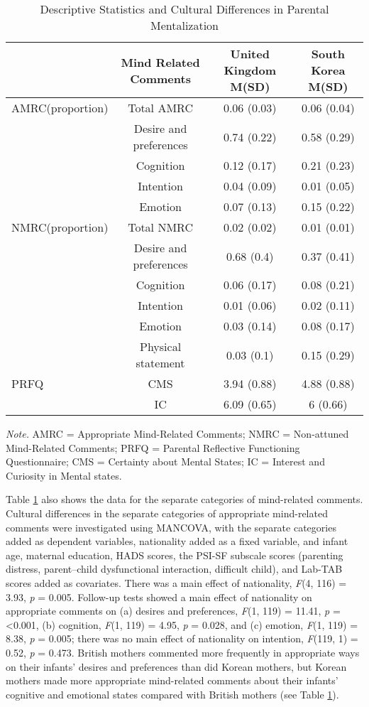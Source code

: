 \documentclass[
]{article}
\begin{document}
\begin{table}[H]

\caption{\label{tab:table2}Descriptive Statistics and Cultural Differences in Parental Mentalization}
\centering
\begin{tabular}[t]{lccc}
\toprule
\textbf{ } & \textbf{Mind Related Comments} & \textbf{United Kingdom M(SD)} & \textbf{South Korea M(SD)}\\
\midrule
AMRC(proportion) & Total AMRC & 0.06 (0.03) & 0.06 (0.04)\\
 & Desire and preferences & 0.74 (0.22) & 0.58 (0.29)\\
 & Cognition & 0.12 (0.17) & 0.21 (0.23)\\
 & Intention & 0.04 (0.09) & 0.01 (0.05)\\
 & Emotion & 0.07 (0.13) & 0.15 (0.22)\\
\addlinespace
NMRC(proportion) & Total NMRC & 0.02 (0.02) & 0.01 (0.01)\\
 & Desire and preferences & 0.68 (0.4) & 0.37 (0.41)\\
 & Cognition & 0.06 (0.17) & 0.08 (0.21)\\
 & Intention & 0.01 (0.06) & 0.02 (0.11)\\
 & Emotion & 0.03 (0.14) & 0.08 (0.17)\\
\addlinespace
 & Physical statement & 0.03 (0.1) & 0.15 (0.29)\\
PRFQ & CMS & 3.94 (0.88) & 4.88 (0.88)\\
 & IC & 6.09 (0.65) & 6 (0.66)\\
\bottomrule
\end{tabular}
\end{table}

\emph{Note.} AMRC = Appropriate Mind-Related Comments; NMRC = Non-attuned Mind-Related Comments; PRFQ = Parental Reflective Functioning Questionnaire; CMS = Certainty about Mental States; IC = Interest and Curiosity in Mental states.

Table \ref{tab:table2} also shows the data for the separate categories of mind-related comments. Cultural differences in the separate categories of appropriate mind-related comments were investigated using MANCOVA, with the separate categories added as dependent variables, nationality added as a fixed variable, and infant age, maternal education, HADS scores, the PSI-SF subscale scores (parenting distress, parent--child dysfunctional interaction, difficult child), and Lab-TAB scores added as covariates.
There was a main effect of nationality, \emph{F}(4, 116) = 3.93, \emph{p} = 0.005.
Follow-up tests showed a main effect of nationality on appropriate comments on (a) desires and preferences, \emph{F}(1, 119) = 11.41, \emph{p} = \textless0.001,
(b) cognition, \emph{F}(1, 119) = 4.95, \emph{p} = 0.028,
and (c) emotion, \emph{F}(1, 119) = 8.38, \emph{p} = 0.005;
there was no main effect of nationality on intention, \emph{F}(119, 1) = 0.52, \emph{p} = 0.473.
British mothers commented more frequently in appropriate ways on their infants' desires and preferences than did Korean mothers, but Korean mothers made more appropriate mind-related comments about their infants' cognitive and emotional states compared with British mothers (see Table \ref{tab:table2}).
\end{document}
